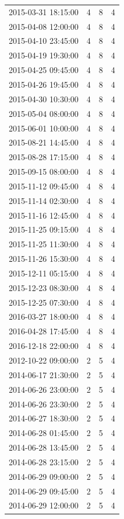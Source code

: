 \begin{tabular}{lrrr}
2015-03-31 18:15:00 & 4 & 8 & 4 \\
2015-04-08 12:00:00 & 4 & 8 & 4 \\
2015-04-10 23:45:00 & 4 & 8 & 4 \\
2015-04-19 19:30:00 & 4 & 8 & 4 \\
2015-04-25 09:45:00 & 4 & 8 & 4 \\
2015-04-26 19:45:00 & 4 & 8 & 4 \\
2015-04-30 10:30:00 & 4 & 8 & 4 \\
2015-05-04 08:00:00 & 4 & 8 & 4 \\
2015-06-01 10:00:00 & 4 & 8 & 4 \\
2015-08-21 14:45:00 & 4 & 8 & 4 \\
2015-08-28 17:15:00 & 4 & 8 & 4 \\
2015-09-15 08:00:00 & 4 & 8 & 4 \\
2015-11-12 09:45:00 & 4 & 8 & 4 \\
2015-11-14 02:30:00 & 4 & 8 & 4 \\
2015-11-16 12:45:00 & 4 & 8 & 4 \\
2015-11-25 09:15:00 & 4 & 8 & 4 \\
2015-11-25 11:30:00 & 4 & 8 & 4 \\
2015-11-26 15:30:00 & 4 & 8 & 4 \\
2015-12-11 05:15:00 & 4 & 8 & 4 \\
2015-12-23 08:30:00 & 4 & 8 & 4 \\
2015-12-25 07:30:00 & 4 & 8 & 4 \\
2016-03-27 18:00:00 & 4 & 8 & 4 \\
2016-04-28 17:45:00 & 4 & 8 & 4 \\
2016-12-18 22:00:00 & 4 & 8 & 4 \\
2012-10-22 09:00:00 & 2 & 5 & 4 \\
2014-06-17 21:30:00 & 2 & 5 & 4 \\
2014-06-26 23:00:00 & 2 & 5 & 4 \\
2014-06-26 23:30:00 & 2 & 5 & 4 \\
2014-06-27 18:30:00 & 2 & 5 & 4 \\
2014-06-28 01:45:00 & 2 & 5 & 4 \\
2014-06-28 13:45:00 & 2 & 5 & 4 \\
2014-06-28 23:15:00 & 2 & 5 & 4 \\
2014-06-29 09:00:00 & 2 & 5 & 4 \\
2014-06-29 09:45:00 & 2 & 5 & 4 \\
2014-06-29 12:00:00 & 2 & 5 & 4 \\

\end{tabular}
